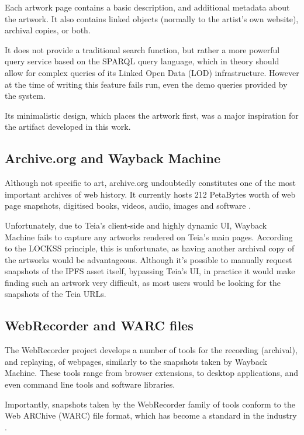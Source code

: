 Each artwork page contains a basic description, and additional metadata about the artwork. It also contains linked objects (normally to the artist's own website), archival copies, or both.

It does not provide a traditional search function, but rather a more powerful query service based on the SPARQL query language, which in theory should allow for complex queries of its Linked Open Data (LOD) infrastructure. However at the time of writing this feature fails run, even the demo queries provided by the system.

Its minimalistic design, which places the artwork first, was a major inspiration for the artifact developed in this work. 

\subsection{Archive.org and Wayback Machine}
\label{subsec:archiveorg}

Although not specific to art, archive.org undoubtedly constitutes one of the most important archives of web history. It currently hosts 212 PetaBytes worth of web page snapshots, digitised books, videos, audio, images and software \cite{InternetArchivePetabox}.

Unfortunately, due to Teia's client-side and highly dynamic UI, Wayback Machine fails to capture any artworks rendered on Teia's main pages. According to the LOCKSS principle, this is unfortunate, as having another archival copy of the artworks would be advantageous. Although it's possible to manually request snapshots of the IPFS asset itself, bypassing Teia's UI, in practice it would make finding such an artwork very difficult, as most users would be looking for the snapshots of the Teia URLs.

\subsection{WebRecorder and WARC files}

The WebRecorder project develops a number of tools for the recording (archival), and replaying, of webpages, similarly to the snapshots taken by Wayback Machine. These tools range from browser extensions, to desktop applications, and even command line tools and software libraries.

Importantly, snapshots taken by the WebRecorder family of tools conform to the Web ARChive (WARC) file format, which has become a standard in the industry \cite{WARCFileFormat2024}.

